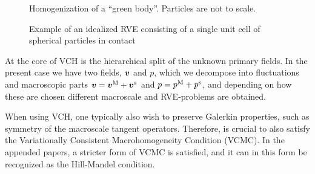 \documentclass[MikaelDissertation.tex]{subfiles}
\begin{document}
\begin{figure}[htpb!]
\centering
{}
\caption{Homogenization of a ``green body''. Particles are not to scale.}
\label{fig:homogenization}
\end{figure}

\begin{figure}[htpb!]
\centering
{}
\caption{Example of an idealized RVE consisting of a single unit cell of spherical particles in contact}
\label{fig:rve_example}
\end{figure}

At the core of VCH is the hierarchical split of the unknown primary fields.
In the present case we have two fields, $\boldsymbol{v}$ and $p$, which we decompose into fluctuations and macroscopic parts $\boldsymbol{v} = \boldsymbol{v}^{\mathrm{M}} + \boldsymbol{v}^{\mathrm{s}}$ and $p = p^{\mathrm{M}} + p^{\mathrm{s}}$, and depending on how these are chosen different macroscale and RVE-problems are obtained.

When using VCH, one typically also wish to preserve Galerkin properties, such as symmetry of the macroscale tangent operators. Therefore, is crucial to also satisfy the Variationally Consistent Macrohomogeneity Condition (VCMC).
In the appended papers, a stricter form of VCMC is satisfied, and it can in this form be recognized as the Hill-Mandel condition.
\end{document}
